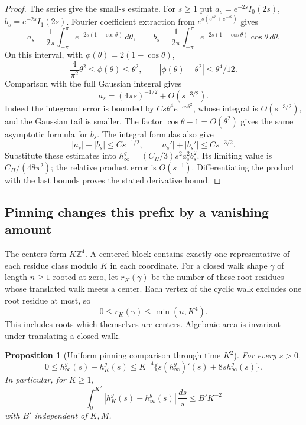 \documentclass[11pt]{article}
\newtheorem{proposition}[theorem]{Proposition}
\theoremstyle{remark}
\begin{document}
\begin{proof}
The series give the small-\(s\) estimate. For \(s\ge1\)
put \(a_s=e^{-2s}I_0(2s)\), \(b_s=e^{-2s}I_1(2s)\).
Fourier coefficient extraction from
\(e^{s(e^{i\theta}+e^{-i\theta})}\) gives
\[
 a_s=\frac1{2\pi}\int_{-\pi}^{\pi}
                   e^{-2s(1-\cos\theta)}\,d\theta,\qquad
 b_s=\frac1{2\pi}\int_{-\pi}^{\pi}
                   e^{-2s(1-\cos\theta)}\cos\theta\,d\theta.
\]
On this interval, with \(\phi(\theta)=2(1-\cos\theta)\),
\[
 \frac{4}{\pi^2}\theta^2\le\phi(\theta)\le\theta^2,\qquad
 |\phi(\theta)-\theta^2|\le\theta^4/12.
\]
Comparison with the full Gaussian integral gives
\[
 a_s=(4\pi s)^{-1/2}+O(s^{-3/2}).
\]
Indeed the integrand error is bounded by
\(Cs\theta^4e^{-c s\theta^2}\), whose integral is
\(O(s^{-3/2})\), and the Gaussian tail is smaller.
The factor \(\cos\theta-1=O(\theta^2)\) gives the
same asymptotic formula for \(b_s\).
The integral formulas also give
\[
 |a_s|+|b_s|\le Cs^{-1/2},\qquad
 |a_s'|+|b_s'|\le Cs^{-3/2}.
\]
Substitute these estimates into
\(h_\infty^g=(C_H/3)s^2a_s^2b_s^2\).
Its limiting value is \(C_H/(48\pi^2)\); the
relative product error is \(O(s^{-1})\).
Differentiating the product with the last bounds
proves the stated derivative bound.
\end{proof}

\subsection{Pinning changes this prefix by a vanishing amount}
\label{pgp-pinning-section}

The centers form \(K\mathbb Z^4\). A centered block
contains exactly one representative of each residue
class modulo \(K\) in each coordinate. For a closed
walk shape \(\gamma\) of length \(n\ge1\) rooted at zero,
let \(r_K(\gamma)\) be the number of these root residues
whose translated walk meets a center. Each vertex
of the cyclic walk excludes one root residue at most,
so
\begin{equation}
               0\le r_K(\gamma)\le\min(n,K^4).
 \label{pgp-root-count}
\end{equation}
This includes roots which themselves are centers.
Algebraic area is invariant under translating a closed
walk.

\begin{proposition}[Uniform pinning comparison through time \(K^2\)]
\label{pgp-pinning}
For every \(s>0\),
\begin{equation}
 0\le h_\infty^g(s)-h_K^g(s)
 \le K^{-4}\{s(h_\infty^g)'(s)+8s h_\infty^g(s)\}.
 \label{pgp-pointwise-pinning}
\end{equation}
In particular, for \(K\ge1\),
\begin{equation}
 \int_0^{K^2}|h_K^g(s)-h_\infty^g(s)|\,\frac{ds}{s}
                                      \le B'K^{-2}
 \label{pgp-prefix-error}
\end{equation}
with \(B'\) independent of \(K,M\).
\end{proposition}
\end{document}
